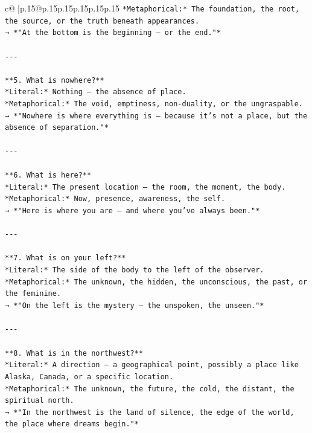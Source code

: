 \documentclass{article}
\begin{document}
{\begin{supertabular}{c@{$\;$}|p{.15\linewidth}@{}p{.15\linewidth}p{.15\linewidth}p{.15\linewidth}p{.15\linewidth}p{.15\linewidth}}
{{{\texttt{*Metaphorical:* The foundation, the root, the source, or the truth beneath appearances.  } \\
\texttt{→ *"At the bottom is the beginning — or the end."*} \\
\\ 
\texttt{{-}{-}{-}} \\
\\ 
\texttt{**5. What is nowhere?**  } \\
\texttt{*Literal:* Nothing — the absence of place.  } \\
\texttt{*Metaphorical:* The void, emptiness, non{-}duality, or the ungraspable.  } \\
\texttt{→ *"Nowhere is where everything is — because it’s not a place, but the absence of separation."*} \\
\\ 
\texttt{{-}{-}{-}} \\
\\ 
\texttt{**6. What is here?**  } \\
\texttt{*Literal:* The present location — the room, the moment, the body.  } \\
\texttt{*Metaphorical:* Now, presence, awareness, the self.  } \\
\texttt{→ *"Here is where you are — and where you’ve always been."*} \\
\\ 
\texttt{{-}{-}{-}} \\
\\ 
\texttt{**7. What is on your left?**  } \\
\texttt{*Literal:* The side of the body to the left of the observer.  } \\
\texttt{*Metaphorical:* The unknown, the hidden, the unconscious, the past, or the feminine.  } \\
\texttt{→ *"On the left is the mystery — the unspoken, the unseen."*} \\
\\ 
\texttt{{-}{-}{-}} \\
\\ 
\texttt{**8. What is in the northwest?**  } \\
\texttt{*Literal:* A direction — a geographical point, possibly a place like Alaska, Canada, or a specific location.  } \\
\texttt{*Metaphorical:* The unknown, the future, the cold, the distant, the spiritual north.  } \\
\texttt{→ *"In the northwest is the land of silence, the edge of the world, the place where dreams begin."*} \\
}}}
\end{supertabular}}
\end{document}

